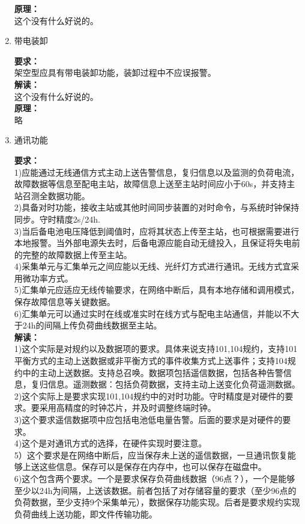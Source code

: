 \documentclass{article}
\begin{document}
\begin{CJK}{UTF8}{gbsn}
\begin{enumerate}
	\textbf{原理：}\\
	这个没有什么好说的。
\item 带电装卸
	\par
	\textbf{要求：}\\
	架空型应具有带电装卸功能，装卸过程中不应误报警。\\
	\textbf{解读：}\\
	这个没有什么好说的。\\
	\textbf{原理：}\\
	略
\item 通讯功能
	\par
	\textbf{要求：}\\
	1)应能通过无线通信方式主动上送告警信息，复归信息以及监测的负荷电流，故障数据等信息至配电主站，故障信息上送至主站时间应小于60s，并支持主站召测全数据功能。\\
	2)具备对时功能，接收主站或其他时间同步装置的对时命令，与系统时钟保持同步。守时精度2s/24h.\\
	3)当后备电池电压降低到阈值时，应将其状态上传至主站，也可根据需要进行本地报警。当外部电源失去时，后备电源应能自动无缝投入，且保证将失电前的完整的故障数据上传至主站。\\
	4)采集单元与汇集单元之间应能以无线、光纤灯方式进行通讯。无线方式宜采用微功率方式。\\
	5)汇集单元应适应无线传输要求，在网络中断后，具有本地存储和调用模式，保存故障信息等关键数据。\\
	6)汇集单元可以通过实时在线或准实时在线方式与配电主站通信，并能以不大于24h的间隔上传负荷曲线数据至主站。\\
	\textbf{解读：}\\
	1)这个实际是对规约以及数据项的要求。具体来说支持101,104规约，支持101平衡方式的主动上送数据或非平衡方式的事件收集方式上送事件；支持104规约中的主动上送数据。支持总召唤。数据项包括遥信数据，包括各种告警信息，复归信息。遥测数据：包括负荷数据，支持主动上送变化负荷遥测数据。\\
	2)这个实际上是要求实现101,104规约中的对时功能。守时精度是对硬件的要求。要采用高精度的时钟芯片，并及时调整终端时钟。\\
	3)这个要求遥信数据项中应包括电池低电量告警。后面的要求是对硬件的要求。\\
	4)这个是对通讯方式的选择，在硬件实现时要注意。\\
	5）这个要求是在网络中断后，应当保存未上送的遥信数据，一旦通讯恢复能够上送这些信息。保存可以是保存在内存中，也可以保存在磁盘中。\\
	6)这个包含两个要求。一个是要求保存负荷曲线数据（96点？），一个是能够至少以24h为间隔，上送该数据。前者包括了对存储容量的要求（至少96点的负荷数据，至少支持9个采集单元），数据保存功能实现。后者是要求规约实现负荷曲线上送功能，即文件传输功能。

\end{enumerate}
\end{CJK}
\end{document}
